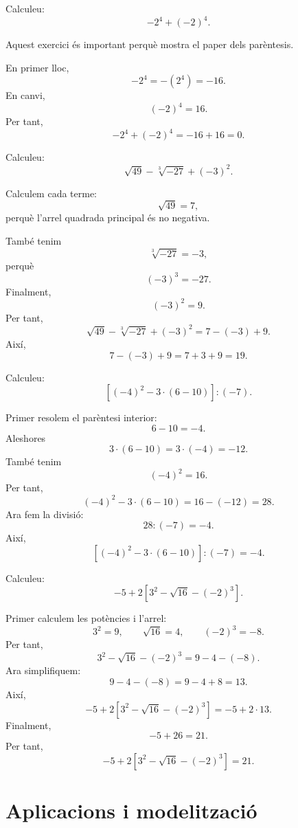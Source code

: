 \begin{exercici}
Calculeu:
\[
	-2^4+(-2)^4.
\]
\end{exercici}

\begin{solucio}
Aquest exercici és important perquè mostra el paper dels parèntesis.

En primer lloc,
\[
	-2^4=-(2^4)=-16.
\]
En canvi,
\[
	(-2)^4=16.
\]
Per tant,
\[
	-2^4+(-2)^4=-16+16=0.
\]
\end{solucio}

\begin{exercici}
Calculeu:
\[
	\sqrt{49}-\sqrt[3]{-27}+(-3)^2.
\]
\end{exercici}

\begin{solucio}
Calculem cada terme:
\[
	\sqrt{49}=7,
\]
perquè l'arrel quadrada principal és no negativa.

També tenim
\[
	\sqrt[3]{-27}=-3,
\]
perquè
\[
	(-3)^3=-27.
\]
Finalment,
\[
	(-3)^2=9.
\]
Per tant,
\[
	\sqrt{49}-\sqrt[3]{-27}+(-3)^2
	=
	7-(-3)+9.
\]
Així,
\[
	7-(-3)+9=7+3+9=19.
\]
\end{solucio}

\begin{exercici}
Calculeu:
\[
	\left[(-4)^2-3\cdot(6-10)\right]:(-7).
\]
\end{exercici}

\begin{solucio}
Primer resolem el parèntesi interior:
\[
	6-10=-4.
\]
Aleshores
\[
	3\cdot(6-10)=3\cdot(-4)=-12.
\]
També tenim
\[
	(-4)^2=16.
\]
Per tant,
\[
	(-4)^2-3\cdot(6-10)=16-(-12)=28.
\]
Ara fem la divisió:
\[
	28:(-7)=-4.
\]
Així,
\[
	\left[(-4)^2-3\cdot(6-10)\right]:(-7)=-4.
\]
\end{solucio}

\begin{exercici}
Calculeu:
\[
	-5+2\left[3^2-\sqrt{16}-(-2)^3\right].
\]
\end{exercici}

\begin{solucio}
Primer calculem les potències i l'arrel:
\[
	3^2=9,
	\qquad
	\sqrt{16}=4,
	\qquad
	(-2)^3=-8.
\]
Per tant,
\[
	3^2-\sqrt{16}-(-2)^3
	=
	9-4-(-8).
\]
Ara simplifiquem:
\[
	9-4-(-8)=9-4+8=13.
\]
Així,
\[
	-5+2\left[3^2-\sqrt{16}-(-2)^3\right]
	=
	-5+2\cdot13.
\]
Finalment,
\[
	-5+26=21.
\]
Per tant,
\[
	-5+2\left[3^2-\sqrt{16}-(-2)^3\right]=21.
\]
\end{solucio}

\section{Aplicacions i modelització}
\label{sec:aplicacions-modelitzacio}

